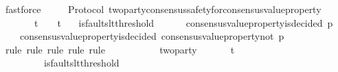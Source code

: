 \begin{isabellebody}
\ fastforce\ \ \ \isanewline
{}\isamarkupfalse%
%
\endisatagproof
{\isafoldproof}%
%
\isadelimproof
\isanewline
%
\endisadelimproof
\isanewline
{}\isamarkupfalse%
\ {\isacharparenleft}\ Protocol{\isacharparenright}\ two{\isacharunderscore}party{\isacharunderscore}consensus{\isacharunderscore}safety{\isacharunderscore}for{\isacharunderscore}consensus{\isacharunderscore}value{\isacharunderscore}property\ {\isacharcolon}\isanewline
\ \ {\isachardoublequoteopen}{\isasymforall}\ {\isasymsigma}{}\ {\isasymsigma}{}{\isachardot}\ {\isasymsigma}{}\ {\isasymin}\ {\isasymSigma}t\ {\isasymand}\ {\isasymsigma}{}\ {\isasymin}\ {\isasymSigma}t\isanewline
\ \ {\isasymlongrightarrow}\ is{\isacharunderscore}faults{\isacharunderscore}lt{\isacharunderscore}threshold\ {\isacharparenleft}{\isasymsigma}{}\ {\isasymunion}\ {\isasymsigma}{}{\isacharparenright}\isanewline
\ \ {\isasymlongrightarrow}\ consensus{\isacharunderscore}value{\isacharunderscore}property{\isacharunderscore}is{\isacharunderscore}decided\ {\isacharparenleft}p{\isacharcomma}\ {\isasymsigma}{}{\isacharparenright}\ \isanewline
\ \ {\isasymlongrightarrow}\ {\isasymnot}\ consensus{\isacharunderscore}value{\isacharunderscore}property{\isacharunderscore}is{\isacharunderscore}decided\ {\isacharparenleft}consensus{\isacharunderscore}value{\isacharunderscore}property{\isacharunderscore}not\ p{\isacharcomma}\ {\isasymsigma}{}{\isacharparenright}{\isachardoublequoteclose}\isanewline
%
\isadelimproof
\ \ %
\endisadelimproof
%
\isatagproof
{}\isamarkupfalse%
\ {\isacharparenleft}rule{\isacharcomma}\ rule{\isacharcomma}\ rule{\isacharcomma}\ rule{\isacharcomma}\ rule{\isacharparenright}\isanewline
{}\isamarkupfalse%
\ {\isacharminus}\isanewline
\ \ \isamarkupfalse%
\ {\isasymsigma}{}\ {\isasymsigma}{}\isanewline
\ \ \isamarkupfalse%
\ two{\isacharunderscore}party{\isacharcolon}\ {\isachardoublequoteopen}{\isasymforall}\ {\isasymsigma}{}\ {\isasymsigma}{}{\isachardot}\ {\isacharbraceleft}{\isasymsigma}{}{\isacharcomma}\ {\isasymsigma}{}{\isacharbraceright}\ {\isasymsubseteq}\ {\isasymSigma}t\isanewline
\ \ \ \ \ \ \ \ {\isasymlongrightarrow}\ is{\isacharunderscore}faults{\isacharunderscore}lt{\isacharunderscore}threshold\ {\isacharparenleft}{\isasymUnion}\ {\isacharbraceleft}{\isasymsigma}{}{\isacharcomma}\ {\isasymsigma}{}{\isacharbraceright}{\isacharparenright}\isanewline

\end{isabellebody}
